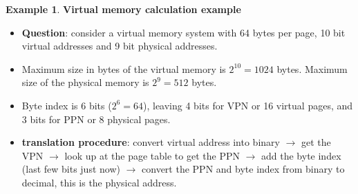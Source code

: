 \documentclass[11pt,a4paper]{article}
\theoremstyle{definition}
\newtheorem{example}{Example}[section]
\newenvironment{myitemize}
{ \begin{itemize}
    \setlength{\itemsep}{5pt}
    \setlength{\parskip}{0pt}
    \setlength{\parsep}{0pt}     }
{ \end{itemize}                  }
\begin{document}
\begin{example}{\textbf{Virtual memory calculation example}}
	\begin{myitemize}
		\item \textbf{Question}: consider a virtual memory system with 64 bytes per page, 10 bit virtual addresses and 9 bit physical addresses.
		\item Maximum size in bytes of the virtual memory is $2^{10}=1024$ bytes. Maximum size of the physical memory is $2^{9}=512$ bytes.
		\item Byte index is 6 bits ($2^6=64$), leaving 4 bits for VPN or 16 virtual pages, and 3 bits for PPN or 8 physical pages.
		\item \textbf{translation procedure}: convert virtual address into binary $\rightarrow$ get the VPN $\rightarrow$ look up at the page table to get the PPN $\rightarrow$ add the byte index (last few bits just now) $\rightarrow$ convert the PPN and byte index from binary to decimal, this is the physical address.
	\end{myitemize}
\end{example}







\end{document}
